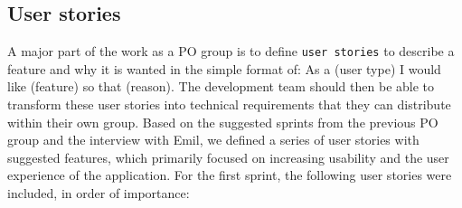 \subsection{User stories}
A major part of the work as a PO group is to define \texttt{user stories} to describe a feature and why it is wanted in the simple format of: As a (user type) I would like (feature) so that (reason).
The development team should then be able to transform these user stories into technical requirements that they can distribute within their own group.
Based on the suggested sprints from the previous PO group and the interview with Emil, we defined a series of user stories with suggested features, which primarily focused on increasing usability and the user experience of the application.
For the first sprint, the following user stories were included, in order of importance:
